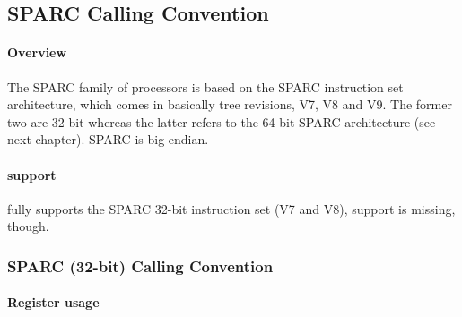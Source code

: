 %
%
%
%

\subsection{SPARC Calling Convention}

\paragraph{Overview}

The SPARC family of processors is based on the SPARC instruction set architecture, which comes in basically tree revisions,
V7, V8 and V9. The former two are 32-bit whereas the latter refers to the 64-bit SPARC architecture (see next chapter). SPARC is big endian.\\

\paragraph{ support}

 fully supports the SPARC 32-bit instruction set (V7 and V8),  support is missing, though.

\subsubsection{SPARC (32-bit) Calling Convention}

\paragraph{Register usage}

